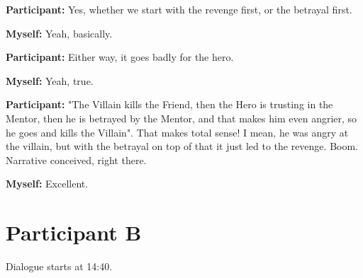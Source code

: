\documentclass[11pt]{report}
\begin{document}
\begin{linenumbers}
\textbf{Participant:} Yes, whether we start with the revenge first, or the betrayal first.

\textbf{Myself:} Yeah, basically.

\textbf{Participant:} Either way, it goes badly for the hero.

\textbf{Myself:} Yeah, true.

\textbf{Participant:} "The Villain kills the Friend, then the Hero is trusting in the Mentor, then he is betrayed by the Mentor, and that makes him even angrier, so he goes and kills the Villain". That makes total sense! I mean, he was angry at the villain, but with the betrayal on top of that it just led to the revenge. Boom. Narrative conceived, right there.

\textbf{Myself:} Excellent.


\end{linenumbers}
\resetlinenumber[1]
\section{Participant B}

Dialogue starts at 14:40.
\end{document}
